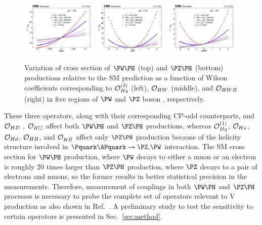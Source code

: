 \documentclass[a4paper,11pt]{article}
\renewcommand{\PV}{{{{V}}}\xspace}
\newcommand{\VH}{{{\PV}{\PH}}\xspace}
\begin{document}
\begin{figure}[hbtp]
\begin{center}
\includegraphics[width=0.321\textwidth]{Figures/LHE/ZH/Canv_cpq3i.png}
\includegraphics[width=0.321\textwidth]{Figures/LHE/ZH/Canv_cpW.png}
\includegraphics[width=0.321\textwidth]{Figures/LHE/ZH/Canv_cpWB.png}
\end{center}
\caption{
Variation of cross section of $\PW\PH$ (top) and $\PZ\PH$ (bottom) productions relative to the SM prediction as a function of Wilson coefficients corresponding to ${\cal O}^{(3)}_{Hq}$ (left), ${\cal O}_{HW}$ (middle), and ${\cal O}_{HWB}$ (right) in five regions of $\PW$ and $\PZ$ boson {\pt}, respectively.
}
\label{fig:LHE_WZH}
\end{figure}
These three operators, along with their corresponding CP-odd counterparts, and ${\cal O}_{HD}$ , ${\cal O}_{H\square}$  affect both $\PW\PH$ and $\PZ\PH$ productions, whereas ${\cal O}^{(1)}_{Hq}$, ${\cal O}_{Hu}$, ${\cal O}_{Hd}$, ${\cal O}_{HB}$, and ${\cal O}_{H\tilde{B}}$ affect only $\PZ\PH$ production 
because of the helicity structure involved in $\Pquark\APquark \to \PZ\text{,}\PW$ interaction.
The SM cross section for $\PW\PH$ production, where $\PW$ decays to either a muon or an electron is roughly 20 times larger than $\PZ\PH$ production, where $\PZ$ decays to a pair of electrons and muons, 
so the former results in better statistical precision in the measurements.
Therefore, measurement of couplings in both $\PW\PH$ and $\PZ\PH$ processes is necessary to probe the complete set of operators relevant to \VH production as also shown in Ref.~\cite{Banerjee:2019twi}.
A preliminary study to test the sensitivity to certain operators is presented in Sec.~\ref{sec:method}. 
\end{document}
